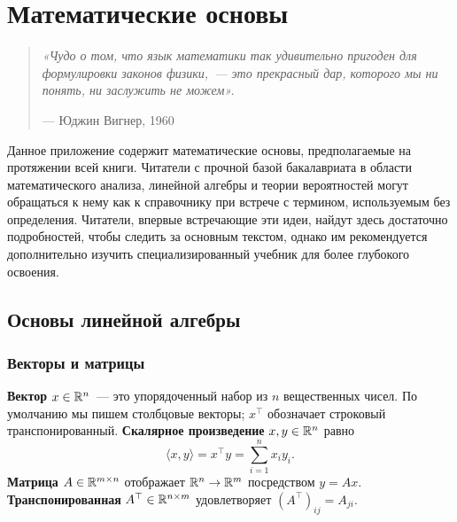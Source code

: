 
\chapter{Математические основы}
\label{app:math}

\begin{quote}
\textit{«Чудо о том, что язык математики так удивительно пригоден для формулировки законов физики,~--- это прекрасный дар, которого мы ни понять, ни заслужить не можем».}
\par\noindent\hfill--- Юджин Вигнер, 1960
\end{quote}

\bigskip

Данное приложение содержит математические основы, предполагаемые на протяжении всей книги. Читатели с прочной базой бакалавриата в области математического анализа, линейной алгебры и теории вероятностей могут обращаться к нему как к справочнику при встрече с термином, используемым без определения. Читатели, впервые встречающие эти идеи, найдут здесь достаточно подробностей, чтобы следить за основным текстом, однако им рекомендуется дополнительно изучить специализированный учебник для более глубокого освоения.

\section{Основы линейной алгебры}
\label{app:linalg}

\subsection*{Векторы и матрицы}

\textbf{Вектор} $x \in \mathbb{R}^n$~--- это упорядоченный набор из $n$ вещественных чисел. По умолчанию мы пишем столбцовые векторы; $x^\top$ обозначает строковый транспонированный. \textbf{Скалярное произведение} $x, y \in \mathbb{R}^n$ равно
\[
    \langle x, y \rangle = x^\top y = \sum_{i=1}^n x_i y_i.
\]
\textbf{Матрица} $A \in \mathbb{R}^{m \times n}$ отображает $\mathbb{R}^n \to \mathbb{R}^m$ посредством $y = Ax$. \textbf{Транспонированная} $A^\top \in \mathbb{R}^{n \times m}$ удовлетворяет $(A^\top)_{ij} = A_{ji}$.

